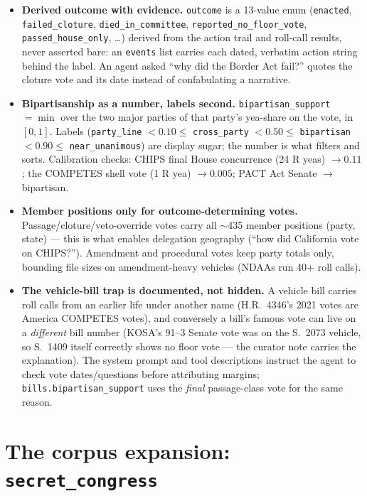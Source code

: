 \documentclass[11pt]{article}
\newcommand{\code}[1]{\texttt{#1}}
\begin{document}
\begin{itemize}[itemsep=2pt]
  \item \textbf{Derived outcome with evidence.} \code{outcome} is a
        13-value enum (\code{enacted}, \code{failed\_cloture},
        \code{died\_in\_committee}, \code{reported\_no\_floor\_vote},
        \code{passed\_house\_only}, \ldots) derived from the action trail
        and roll-call results, never asserted bare: an \code{events} list
        carries each dated, verbatim action string behind the label. An
        agent asked ``why did the Border Act fail?'' quotes the cloture
        vote and its date instead of confabulating a narrative.
  \item \textbf{Bipartisanship as a number, labels second.}
        \code{bipartisan\_support} $=\min$ over the two major parties of
        that party's yea-share on the vote, in $[0,1]$. Labels
        (\code{party\_line} $<0.10\le$ \code{cross\_party} $<0.50\le$
        \code{bipartisan} $<0.90\le$ \code{near\_unanimous}) are
        display sugar; the number is what filters and sorts. Calibration
        checks: CHIPS final House concurrence (24 R yeas) $\to 0.11$;
        the COMPETES shell vote (1 R yea) $\to 0.005$; PACT Act Senate
        $\to$ bipartisan.
  \item \textbf{Member positions only for outcome-determining votes.}
        Passage/cloture/veto-override votes carry all $\sim$435 member
        positions (party, state) --- this is what enables delegation
        geography (``how did California vote on CHIPS?''). Amendment and
        procedural votes keep party totals only, bounding file sizes on
        amendment-heavy vehicles (NDAAs run 40+ roll calls).
  \item \textbf{The vehicle-bill trap is documented, not hidden.} A
        vehicle bill carries roll calls from an earlier life under another
        name (H.R.~4346's 2021 votes are America COMPETES votes), and
        conversely a bill's famous vote can live on a \emph{different}
        bill number (KOSA's 91--3 Senate vote was on the S.~2073 vehicle,
        so S.~1409 itself correctly shows no floor vote --- the curator
        note carries the explanation). The system prompt and tool
        descriptions instruct the agent to check vote dates/questions
        before attributing margins; \code{bills.bipartisan\_support} uses
        the \emph{final} passage-class vote for the same reason.
\end{itemize}

\section{The corpus expansion: \code{secret\_congress}}
\end{document}
